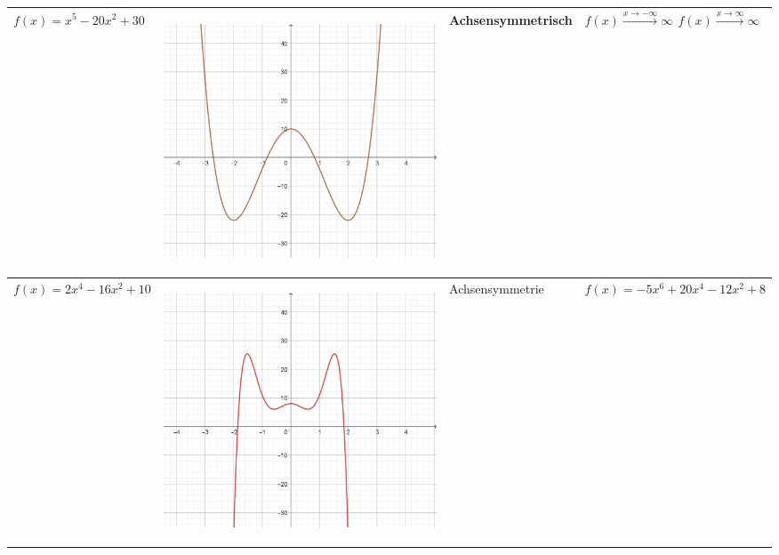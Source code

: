 \documentclass[oneside,openany,headings=optiontotoc,11pt,numbers=noenddot]{scrreprt}
\begin{document}
\begin{table}
\begin{tabular}{|M{4.35cm}|M{4.35cm}||M{4.35cm}|M{4.35cm}|}
			\hline
			 \(f(x)=x^5 - 20x^2 + 30\)  & \begin{center}\includegraphics[scale=0.15]{04-GanzrationaleFunktionen/g1.jpg}\end{center} & Achsensymmetrisch & \\
			\hline
			\(f(x)=2x^4-16x^2+10\)  & \begin{center}\includegraphics[scale=0.15]{04-GanzrationaleFunktionen/h1.jpg}\end{center} & Achsensymmetrie & \(f(x) = -5x^6+20x^4-12x^2+8\) \\
			\hline
		\end{tabular}
	\end{table}
\end{document}
